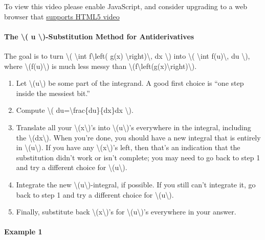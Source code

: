 To view this video please enable JavaScript, and consider upgrading to a
web browser that \href{http://videojs.com/html5-video-support/}{supports
HTML5 video}

\hypertarget{the-u--substitution-method-for-antiderivatives}{%
\paragraph{The \textbackslash{}( u \textbackslash{})-Substitution Method
for
Antiderivatives}\label{the-u--substitution-method-for-antiderivatives}}

The goal is to turn \textbackslash{}( \textbackslash{}int
f\textbackslash{}left( g(x) \textbackslash{}right)\textbackslash{}, dx
\textbackslash{}) into \textbackslash{}( \textbackslash{}int
f(u)\textbackslash{}, du \textbackslash{}), where
\textbackslash{}(f(u)\textbackslash{}) is much less messy than
\textbackslash{}(f\textbackslash{}left(g(x)\textbackslash{}right)\textbackslash{}).

\begin{enumerate}
\tightlist
\item
  Let \textbackslash{}(u\textbackslash{}) be some part of the integrand.
  A good first choice is ``one step inside the messiest bit.''
\item
  Compute \textbackslash{}( du=\textbackslash{}frac\{du\}\{dx\}dx
  \textbackslash{}).
\item
  Translate all your \textbackslash{}(x\textbackslash{})'s into
  \textbackslash{}(u\textbackslash{})'s everywhere in the integral,
  including the \textbackslash{}(dx\textbackslash{}). When you're done,
  you should have a new integral that is entirely in
  \textbackslash{}(u\textbackslash{}). If you have any
  \textbackslash{}(x\textbackslash{})'s left, then that's an indication
  that the substitution didn't work or isn't complete; you may need to
  go back to step 1 and try a different choice for
  \textbackslash{}(u\textbackslash{}).
\item
  Integrate the new \textbackslash{}(u\textbackslash{})-integral, if
  possible. If you still can't integrate it, go back to step 1 and try a
  different choice for \textbackslash{}(u\textbackslash{}).
\item
  Finally, substitute back \textbackslash{}(x\textbackslash{})'s for
  \textbackslash{}(u\textbackslash{})'s everywhere in your answer.
\end{enumerate}

\hypertarget{example-1}{%
\paragraph{Example 1}\label{example-1}}

